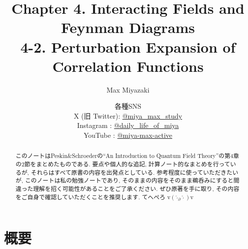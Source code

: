 \documentclass[a4paper,12pt]{article}
\title{Chapter 4. Interacting Fields and Feynman Diagrams\\
4-2. Perturbation Expansion of Correlation Functions}
\date{各種SNS\\
    X (旧 Twitter): \href{https://x.com/miya_max_study}{@miya\_max\_study}\\
    Instagram : \href{https://www.instagram.com/daily_life_of_miya/}{@daily\_life\_of\_miya}\\
    YouTube : \href{https://www.youtube.com/@miya-max-active}{@miya-max-active}
    }
\author{Max Miyazaki}
\begin{document}
\maketitle

\vspace{1cm}
\begin{abstract}
    このノートはPeskin\&Schroederの``An Introduction to Quantum Field Theory''の第4章の2節をまとめたものである. 要点や個人的な追記, 計算ノート的なまとめを行っているが, それらはすべて原書の内容を出発点としている. 参考程度に使っていただきたいが, このノートは私の勉強ノートであり, そのままの内容をそのまま鵜呑みにすると間違った理解を招く可能性があることをご了承ください. ぜひ原著を手に取り, その内容をご自身で確認していただくことを推奨します. てへぺろ v$({\hat{\cdot}_\partial \hat{\cdot}})$v
\end{abstract}
    
    

\newpage
\color{blue}
\section*{概要}
\end{document}
